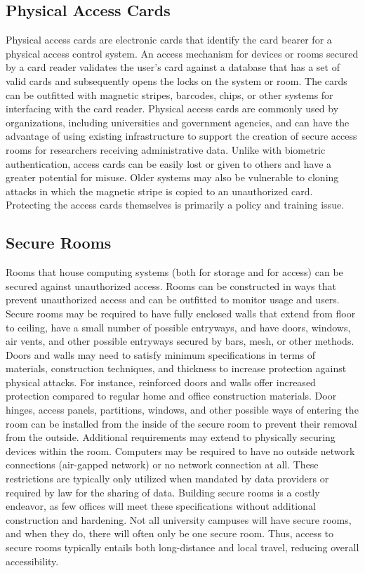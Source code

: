 \hypertarget{physical-access-cards}{%
\subsection{Physical Access Cards}\label{physical-access-cards}}

Physical access cards are electronic cards that identify the card bearer for a physical access control system. An access mechanism for devices or rooms secured by a card reader validates the user's card against a database that has a set of valid cards and subsequently opens the locks on the system or room. The cards can be outfitted with magnetic stripes, barcodes, chips, or other systems for interfacing with the card reader. Physical access cards are commonly used by organizations, including universities and government agencies, and can have the advantage of using existing infrastructure to support the creation of secure access rooms for researchers receiving administrative data. Unlike with biometric authentication, access cards can be easily lost or given to others and have a greater potential for misuse. Older systems may also be vulnerable to cloning attacks in which the magnetic stripe is copied to an unauthorized card. Protecting the access cards themselves is primarily a policy and training issue.

\hypertarget{secure-rooms}{%
\subsection{Secure Rooms}\label{secure-rooms}}

Rooms that house computing systems (both for storage and for access) can be secured against unauthorized access. Rooms can be constructed in ways that prevent unauthorized access and can be outfitted to monitor usage and users. Secure rooms may be required to have fully enclosed walls that extend from floor to ceiling, have a small number of possible entryways, and have doors, windows, air vents, and other possible entryways secured by bars, mesh, or other methods. Doors and walls may need to satisfy minimum specifications in terms of materials, construction techniques, and thickness to increase protection against physical attacks. For instance, reinforced doors and walls offer increased protection compared to regular home and office construction materials. Door hinges, access panels, partitions, windows, and other possible ways of entering the room can be installed from the inside of the secure room to prevent their removal from the outside. Additional requirements may extend to physically securing devices within the room. Computers may be required to have no outside network connections (air-gapped network) or no network connection at all. These restrictions are typically only utilized when mandated by data providers or required by law for the sharing of data. Building secure rooms is a costly endeavor, as few offices will meet these specifications without additional construction and hardening. Not all university campuses will have secure rooms, and when they do, there will often only be one secure room. Thus, access to secure rooms typically entails both long-distance and local travel, reducing overall accessibility.

